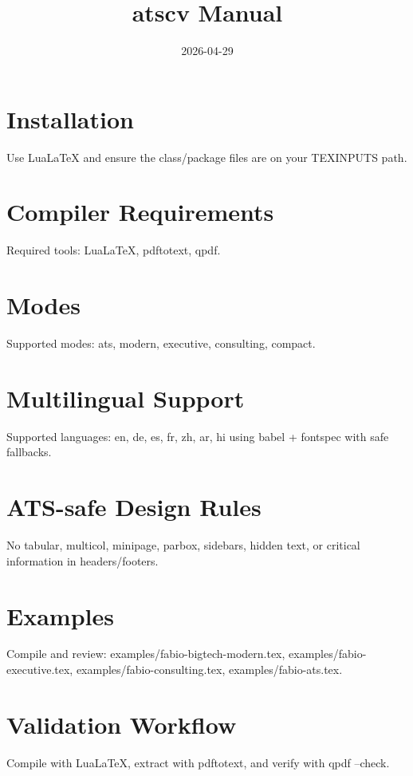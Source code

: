 \documentclass{article}
\title{atscv Manual}
\date{2026-04-29}
\begin{document}
\maketitle
\section{Installation}
Use LuaLaTeX and ensure the class/package files are on your TEXINPUTS path.
\section{Compiler Requirements}
Required tools: LuaLaTeX, pdftotext, qpdf.
\section{Modes}
Supported modes: ats, modern, executive, consulting, compact.
\section{Multilingual Support}
Supported languages: en, de, es, fr, zh, ar, hi using babel + fontspec with safe fallbacks.
\section{ATS-safe Design Rules}
No tabular, multicol, minipage, parbox, sidebars, hidden text, or critical information in headers/footers.
\section{Examples}
Compile and review: examples/fabio-bigtech-modern.tex, examples/fabio-executive.tex, examples/fabio-consulting.tex, examples/fabio-ats.tex.
\section{Validation Workflow}
Compile with LuaLaTeX, extract with pdftotext, and verify with qpdf --check.
\end{document}
